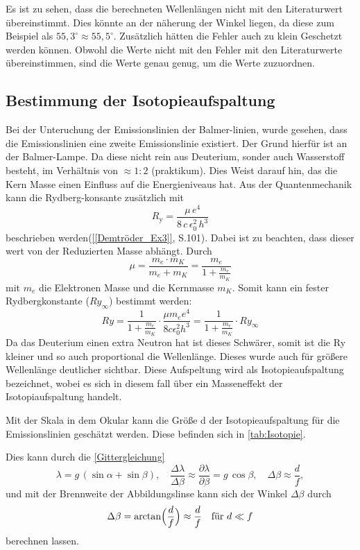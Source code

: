 Es ist zu sehen, dass die berechneten Wellenlängen nicht mit den Literaturwert übereinstimmt. 
Dies könnte an der näherung der Winkel liegen, da diese zum Beispiel als $55,3^\circ \approx 55,5^\circ$.
Zusätzlich hätten die Fehler auch zu klein Geschetzt werden können.
Obwohl die Werte nicht mit den Fehler mit den Literaturwerte übereinstimmen, sind die Werte genau genug, um die Werte zuzuordnen. 


\subsection{Bestimmung der Isotopieaufspaltung}

Bei der Unteruchung der Emissionslinien der Balmer-linien, wurde gesehen, dass die Emissionslinien eine zweite Emissionslinie existiert.
Der Grund hierfür ist an der Balmer-Lampe. 
Da diese nicht rein aus Deuterium, sonder auch Wasserstoff besteht, im Verhältnis von $\approx 1 : 2$ (praktikum). 
Dies Weist darauf hin, das die Kern Masse einen Einfluss auf die Energieniveaus hat. 
Aus der Quantenmechanik kann die Rydberg-konsante zusätzlich mit 
\begin{equation}
  R_{\mathrm{y}} = \frac{\mu\,e^4}{8\,c\,\epsilon_0^2\,h^3}
\end{equation}
beschrieben werden(\cref{[Demtröder_Ex3]}, S.101). Dabei ist zu beachten, dass dieser wert von der Reduzierten Masse abhängt.
Durch 
\begin{equation}
    \mu = \frac{m_e \cdot m_K}{m_e + m_K} = \frac{m_e}{1+\frac{m_e}{m_K}}
\end{equation}
mit $m_e$ die Elektronen Masse und die Kernmasse $m_K$.
Somit kann ein fester Rydbergkonstante ($Ry_\infty$) bestimmt werden: 
\begin{equation}
    Ry = \frac{1}{1+\frac{m_e}{m_K}}\cdot \frac{\mu m_e e^4}{8c \epsilon_0^2h^3} = \frac{1}{1 + \frac{m_e}{m_K}}\cdot Ry_\infty
\end{equation}
Da das Deuterium einen extra Neutron hat ist dieses Schwärer, somit ist die Ry kleiner und so auch proportional die Wellenlänge. 
Dieses wurde auch für größere Wellenlänge deutlicher sichtbar.
Diese Aufspeltung wird als Isotopieaufspaltung bezeichnet, wobei es sich in diesem fall über ein Masseneffekt der Isotopiaufspaltung handelt.

Mit der Skala in dem Okular kann die Größe d der Isotopieaufspaltung für die Emissionslinien geschätzt werden. 
Diese befinden sich in \cref{tab:Isotopie}.

Dies kann durch die \cref{Gittergleichung}
\begin{equation}
  \lambda = g\,(\sin\alpha + \sin\beta),
  \quad
\frac{\Delta\lambda}{\Delta\beta} \approx 
  \frac{\partial\lambda}{\partial\beta} = g\,\cos\beta,
  \quad
  \Delta\beta \approx \frac{d}{f},
\end{equation}
und mit der Brennweite der Abbildungslinse kann sich der Winkel $\Delta\beta$ durch 
\begin{equation}
    \Delta\beta = \arctan\Bigl(\frac{d}{f}\Bigr) \approx \frac{d}{f} \quad \text{für } d \ll f
\end{equation}
berechnen lassen.

